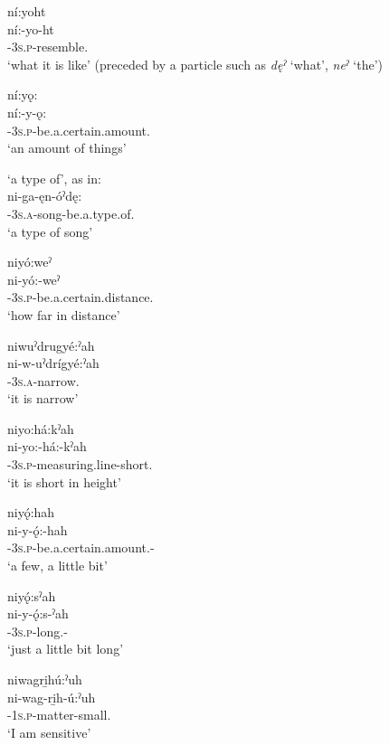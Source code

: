 \ex ní:yoht\\
\gll ní:-yo-ht\\
{\partitive}-\textsc{3s.p}-resemble.{\stative}\\
\glt `what it is like' (preceded by a particle such as \textit{dęˀ} ‘what’, \textit{neˀ} ‘the’)

\ex ní:yǫ:\\
\gll ní:-y-ǫ:\\
{\partitive}-\textsc{3s.p}-be.a.certain.amount.{\stative}\\
\glt `an amount of things'

\ex {}  ‘a type of’, as in:\\
\gll ni-ga-ęn-óˀdę:\\
{\partitive}-\textsc{3s.a}-song-be.a.type.of.{\stative}\\
\glt `a type of song'

\ex niyó:weˀ\\
\gll ni-yó:-weˀ\\
{\partitive}-\textsc{3s.p}-be.a.certain.distance.{\stative}\\
\glt `how far in distance'

\ex niwuˀdrugyé:ˀah\\
\gll ni-w-uˀdrígyé:ˀah\\
\textsc{\partitive-3s.a}-narrow.{\stative}\\
\glt `it is narrow'

\ex niyo:há:kˀah\\
\gll ni-yo:-há:-kˀah\\
{\partitive}-\textsc{3s.p}-measuring.line-short.{\stative}\\
\glt `it is short in height'

\ex niyǫ́:hah\\
\gll ni-y-ǫ́:-hah\\
{\partitive}-\textsc{3s.p}-be.a.certain.amount.{\stative}-{\diminutive}\\
\glt `a few, a little bit'

\ex niyǫ́:sˀah\\
\gll ni-y-ǫ́:s-ˀah\\
\textsc{\partitive-3s.p}-long.{\stative}-{\diminutive}\\
\glt `just a little bit long'

\ex niwagri̱hú:ˀuh\\
\gll ni-wag-ri̱h-ú:ˀuh\\
{\partitive}-\textsc{1s.p}-matter-small.{\stative}\\
\glt `I am sensitive'

